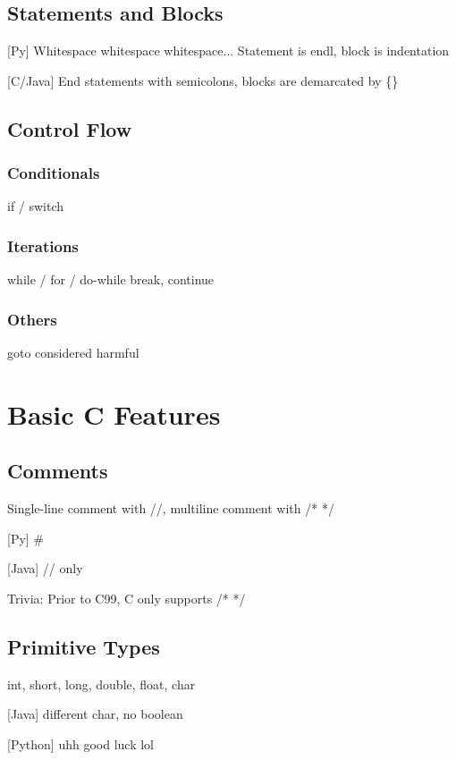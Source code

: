     
    \section{Statements and Blocks}
    [Py] Whitespace whitespace whitespace...
    Statement is endl, block is indentation

    [C/Java] End statements with semicolons, blocks are demarcated by  \{\}
    
    \section{Control Flow}
        \subsection{Conditionals}
        if / switch
        \subsection{Iterations}
        while / for / do-while
        break, continue
        \subsection{Others}
        goto considered harmful

\chapter{Basic C Features}
    \section{Comments}
    Single-line comment with //, multiline comment with /* */ 
    
    [Py] \#
    
    [Java] // only
    
    Trivia: Prior to C99, C only supports /* */

    
    \section{Primitive Types}
    int, short, long, double, float, char

    [Java] different char, no boolean

    [Python] uhh good luck lol 

